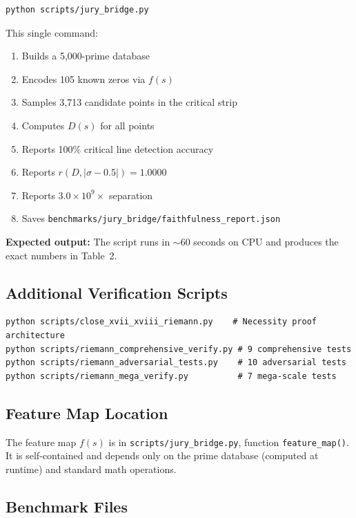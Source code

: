 \documentclass[11pt]{article}
\begin{document}
\begin{verbatim}
python scripts/jury_bridge.py
\end{verbatim}

This single command:
\begin{enumerate}[nosep]
\item Builds a 5,000-prime database
\item Encodes 105 known zeros via $f(s)$
\item Samples 3,713 candidate points in the critical strip
\item Computes $D(s)$ for all points
\item Reports 100\% critical line detection accuracy
\item Reports $r(D, |\sigma-0.5|) = 1.0000$
\item Reports $3.0 \times 10^9\times$ separation
\item Saves \texttt{benchmarks/jury\_bridge/faithfulness\_report.json}
\end{enumerate}

\textbf{Expected output:} The script runs in $\sim$60 seconds on CPU and produces the exact numbers in Table~2.

\subsection{Additional Verification Scripts}

\begin{verbatim}
python scripts/close_xvii_xviii_riemann.py    # Necessity proof architecture
python scripts/riemann_comprehensive_verify.py # 9 comprehensive tests
python scripts/riemann_adversarial_tests.py    # 10 adversarial tests
python scripts/riemann_mega_verify.py          # 7 mega-scale tests
\end{verbatim}

\subsection{Feature Map Location}

The feature map $f(s)$ is in \texttt{scripts/jury\_bridge.py}, function \texttt{feature\_map()}. It is self-contained and depends only on the prime database (computed at runtime) and standard math operations.

\subsection{Benchmark Files}
\end{document}
